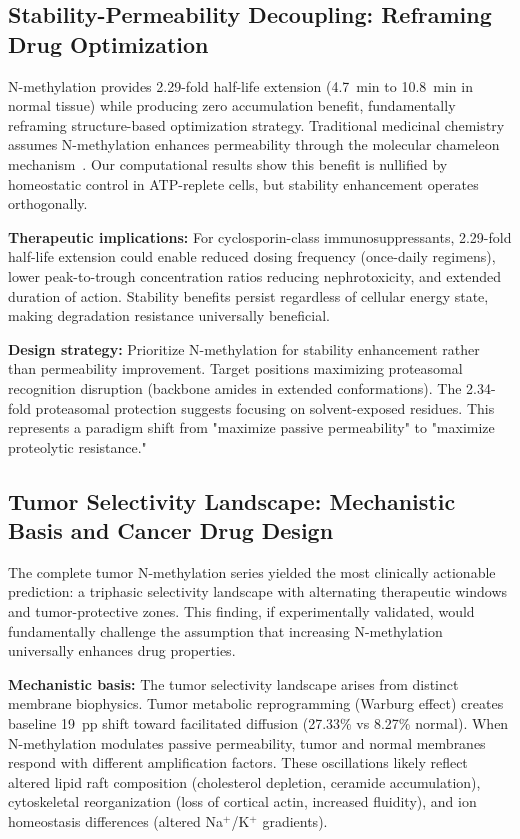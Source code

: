 \documentclass[10pt,letterpaper]{article}
\begin{document}
\subsection{Stability-Permeability Decoupling: Reframing Drug Optimization}

N-methylation provides 2.29-fold half-life extension (4.7~min to 10.8~min in normal tissue) while producing zero accumulation benefit, fundamentally reframing structure-based optimization strategy. Traditional medicinal chemistry assumes N-methylation enhances permeability through the molecular chameleon mechanism~\cite{Whitty2016,Rezai2006}. Our computational results show this benefit is nullified by homeostatic control in ATP-replete cells, but stability enhancement operates orthogonally.

\textbf{Therapeutic implications:} For cyclosporin-class immunosuppressants, 2.29-fold half-life extension could enable reduced dosing frequency (once-daily regimens), lower peak-to-trough concentration ratios reducing nephrotoxicity, and extended duration of action. Stability benefits persist regardless of cellular energy state, making degradation resistance universally beneficial.

\textbf{Design strategy:} Prioritize N-methylation for stability enhancement rather than permeability improvement. Target positions maximizing proteasomal recognition disruption (backbone amides in extended conformations). The 2.34-fold proteasomal protection suggests focusing on solvent-exposed residues. This represents a paradigm shift from "maximize passive permeability" to "maximize proteolytic resistance."

\subsection{Tumor Selectivity Landscape: Mechanistic Basis and Cancer Drug Design}

The complete tumor N-methylation series yielded the most clinically actionable prediction: a triphasic selectivity landscape with alternating therapeutic windows and tumor-protective zones. This finding, if experimentally validated, would fundamentally challenge the assumption that increasing N-methylation universally enhances drug properties.

\textbf{Mechanistic basis:} The tumor selectivity landscape arises from distinct membrane biophysics. Tumor metabolic reprogramming (Warburg effect) creates baseline 19~pp shift toward facilitated diffusion (27.33\% vs 8.27\% normal). When N-methylation modulates passive permeability, tumor and normal membranes respond with different amplification factors. These oscillations likely reflect altered lipid raft composition (cholesterol depletion, ceramide accumulation), cytoskeletal reorganization (loss of cortical actin, increased fluidity), and ion homeostasis differences (altered Na$^+$/K$^+$ gradients).
\end{document}
